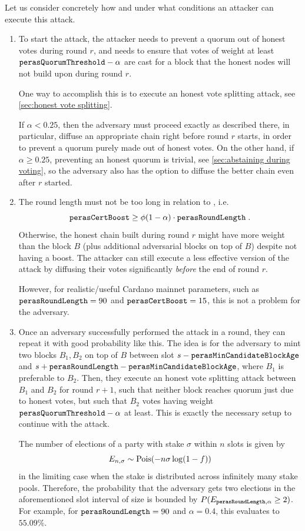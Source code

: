 \medskip
Let us consider concretely how and under what conditions an attacker can execute this attack.
\begin{enumerate}
\item
  To start the attack, the attacker needs to prevent a quorum out of honest votes during round $r$, and needs to ensure that votes of weight at least $\mathtt{perasQuorumThreshold} - \alpha$ are cast for a block that the honest nodes will not build upon during round $r$.

  One way to accomplish this is to execute an honest vote splitting attack, see \cref{sec:honest vote splitting}.

  If $\alpha<0.25$, then the adversary must proceed exactly as described there, in particular, diffuse an appropriate chain right before round $r$ starts, in order to prevent a quorum purely made out of honest votes.
  On the other hand, if $\alpha\ge 0.25$, preventing an honest quorum is trivial, see \cref{sec:abstaining during voting}, so the adversary also has the option to diffuse the better chain even after $r$ started.
\item
  The round length \perasRoundSlots{} must not be too long in relation to \perasBoost{}, i.e.
  \[ \mathtt{perasCertBoost} \ge \phi(1-\alpha)\cdot \mathtt{perasRoundLength} \;. \]
  Otherwise, the honest chain built during round $r$ might have more weight than the block $B$ (plus additional adversarial blocks on top of $B$) despite not having a boost.
  The attacker can still execute a less effective version of the attack by diffusing their votes significantly \emph{before} the end of round $r$.

  However, for realistic/useful Cardano mainnet parameters, such as $\mathtt{perasRoundLength} = 90$ and $\mathtt{perasCertBoost} = 15$, this is not a problem for the adversary.
\item
  Once an adversary successfully performed the attack in a round, they can repeat it with good probability like this.
  The idea is for the adversary to mint two blocks $B_1,B_2$ on top of $B$ between slot $s-\mathtt{perasMinCandidateBlockAge}$ and $s+\mathtt{perasRoundLength} -\mathtt{perasMinCandidateBlockAge}$, where $B_1$ is preferable to $B_2$.
  Then, they execute an honest vote splitting attack between $B_1$ and $B_2$ for round $r+1$, such that neither block reaches quorum just due to honest votes, but such that $B_2$ votes having weight $\mathtt{perasQuorumThreshold} - \alpha$ at least.
  This is exactly the necessary setup to continue with the attack.

  The number of elections of a party with stake $\sigma$ within $n$ slots is given by
  \[ E_{n,\sigma}\sim\operatorname{Pois}(-n\sigma\log(1-f)) \]
  in the limiting case when the stake is distributed across infinitely many stake pools.
  Therefore, the probability that the adversary gets two elections in the aforementioned slot interval of size \perasRoundSlots{} is bounded by $P(E_{\mathtt{perasRoundLength},\alpha}\ge 2)$.
  For example, for $\mathtt{perasRoundLength} = 90$ and $\alpha=0.4$, this evaluates to $55.09\%$.


\end{enumerate}
